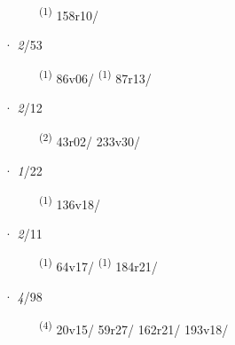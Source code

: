 \begin{description}
    \item[]  \textsuperscript{(1)} \mbox{158r10/}
\end{description}
\ENTRYEND
\noindent{} · \textit{2}/53 \LEMMALINE
\begin{description}
    \item[]  \textsuperscript{(1)} \mbox{86v06/} \CASEBREAK {} \textsuperscript{(1)} \mbox{87r13/}
\end{description}
\ENTRYEND
\noindent{} · \textit{2}/12 \LEMMALINE
\begin{description}
    \item[]  \textsuperscript{(2)} \mbox{43r02/} \mbox{233v30/}
\end{description}
\ENTRYEND
\noindent{} · \textit{1}/22 \LEMMALINE
\begin{description}
    \item[]  \textsuperscript{(1)} \mbox{136v18/}
\end{description}
\ENTRYEND
\noindent{} · \textit{2}/11 \LEMMALINE
\begin{description}
    \item[]  \textsuperscript{(1)} \mbox{64v17/} \CASEBREAK {} \textsuperscript{(1)} \mbox{184r21/}
\end{description}
\ENTRYEND
\noindent{} · \textit{4}/98 \LEMMALINE
\begin{description}
    \item[]  \textsuperscript{(4)} \mbox{20v15/} \mbox{59r27/} \mbox{162r21/} \mbox{193v18/}
\end{description}
